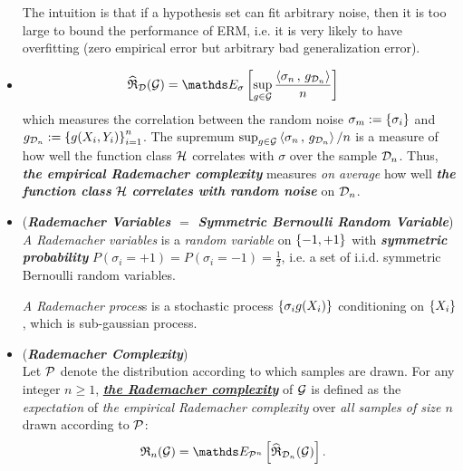 \documentclass[11pt]{article}
\begin{document}
\begin{itemize}
\begin{remark}
The intuition is that if a hypothesis set can fit arbitrary noise, then it is too large to bound the performance of ERM, i.e. it is very likely to have overfitting (zero empirical error but arbitrary bad generalization error).
\end{remark}

\item \begin{remark}
\begin{align*}
\widehat{\mathfrak{R}}_{\cD}(\cG)&= \E{\sigma}{\sup_{g \in \cG}\frac{\inn{\sigma_n}{g_{\cD_n}}}{n}}
\end{align*} which measures the correlation between the random noise $\sigma_m := \left\{\sigma_i\right\}$ and $g_{{\mathcal D}_n} := \left\{g(X_i, Y_i)\right\}_{i=1}^{n}$. The supremum $\sup_{g \in {\mathcal G}} \left\langle \sigma_n\,,\, g_{{\mathcal D}_n} \right\rangle/n$ is a measure of how well the function class ${\mathcal H}$ correlates with $\sigma$ over the sample ${\mathcal D}_n$. Thus, \emph{\textbf{the empirical Rademacher complexity}} measures \emph{on average} how well \emph{\textbf{the function class}} ${\mathcal H}$ \emph{\textbf{correlates with random noise}} on ${\mathcal D}_n$. 
\end{remark}

\item \begin{remark} (\emph{\textbf{Rademacher Variables $=$ Symmetric Bernoulli Random Variable}})\\
\emph{A Rademacher variables} is a \emph{random variable} on $\left\{-1, +1\right\}$ with \emph{\textbf{symmetric probability}} $P(\sigma_i = +1) = P(\sigma_i = -1)= \frac{1}{2}$, i.e. a set of i.i.d. symmetric Bernoulli random variables.

\emph{A Rademacher proces}s is a stochastic process $\left\{\sigma_i g(X_i)\right\}$ conditioning on $\left\{X_i\right\}$, which is sub-gaussian process.
\end{remark}


\item \begin{definition} (\emph{\textbf{Rademacher Complexity}})\\
Let ${\mathcal P}$ denote the distribution according to which samples are drawn. For any integer $n \ge 1$, \underline{\emph{\textbf{the Rademacher complexity}}} of ${\mathcal G}$ is defined as the \emph{expectation} of \emph{the empirical
Rademacher complexity} over \emph{all samples of size $n$} drawn according to ${\mathcal P}$:
\begin{align*}
\frR_{n}(\cG) &= \E{\cP^{n}}{\widehat{\mathfrak{R}}_{\cD_n}(\cG)}.
\end{align*}
\end{definition}


\end{itemize}
\end{document}
